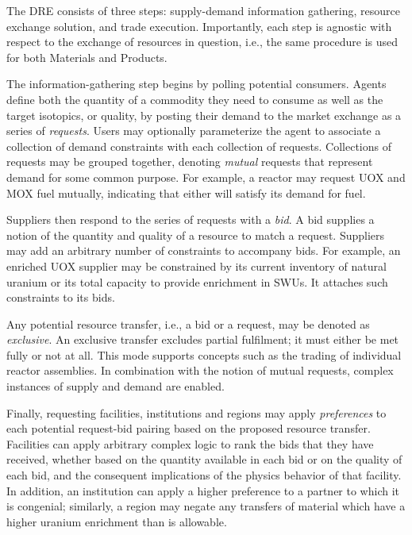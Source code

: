 The \gls{DRE} consists of three steps: supply-demand information
gathering, resource exchange solution, and trade execution. Importantly, each
step is agnostic with respect to the exchange of resources in question, i.e.,
the same procedure is used for both Materials and Products.

The information-gathering step begins by polling potential consumers. Agents
define both the quantity of a commodity they need to consume as well as the
target isotopics, or quality, by posting their demand to the market exchange as
a series of \textit{requests}. Users may optionally parameterize the agent to
associate a collection of demand constraints with each collection of requests.
Collections of requests may be grouped together, denoting \textit{mutual}
requests that represent demand for
some common purpose. For example, a reactor may request \gls{UOX} and \gls{MOX} fuel
mutually, indicating that either will satisfy its demand for fuel.

Suppliers then respond to the series of requests with a \textit{bid}. A bid
supplies a notion of the quantity and quality of a resource to match a
request. Suppliers may add an arbitrary number of constraints to accompany
bids. For example, an enriched \gls{UOX} supplier may be constrained by its current
inventory of natural uranium or its total capacity to provide enrichment
in \glspl{SWU}. It attaches such constraints to its bids.

Any potential resource transfer, i.e., a bid or a request, may be denoted as
\textit{exclusive}. An exclusive transfer excludes partial fulfilment; it must
either be met fully or not at all. This mode supports concepts such as the
trading of individual reactor assemblies.  In combination with the notion of
mutual requests, complex instances
of supply and demand are enabled.

Finally, requesting facilities, institutions and regions may apply
\textit{preferences} to each potential request-bid pairing based on the proposed
resource transfer. Facilities can apply arbitrary complex logic to rank the bids
that they have received, whether based on the quantity available in each bid or
on the quality of each bid, and the consequent implications of the physics behavior
of that facility. In addition, an institution can apply a higher preference to a
partner to which it is congenial; similarly, a region may negate any transfers
of material which have a higher uranium enrichment than is allowable.

